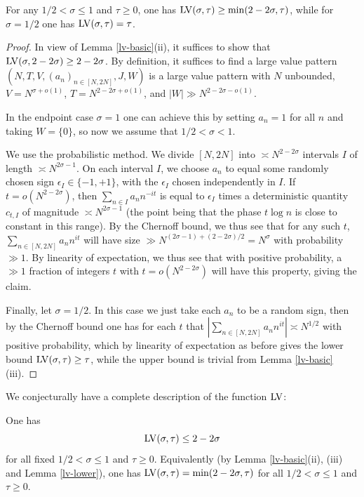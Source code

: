 \begin{lemma}\label{lv-lower}  For any $1/2 < \sigma \leq 1$ and $\tau \geq 0$, one has $\mathrm{LV}(\sigma, \tau) \geq \min(2 - 2 \sigma,\tau)$, while for $\sigma=1/2$ one has $\mathrm{LV}(\sigma,\tau) = \tau$.
\end{lemma}

\begin{proof} In view of Lemma \ref{lv-basic}(ii), it suffices to show that $\mathrm{LV}(\sigma, 2-2\sigma) \geq 2-2\sigma$.  By definition, it suffices to find a large value pattern $(N,T,V,(a_n)_{n \in [N,2N]},J,W)$ is a large value pattern with $N$ unbounded, $V=N^{\sigma+o(1)}$, $T = N^{2-2\sigma+o(1)}$, and $|W| \gg N^{2-2\sigma-o(1)}$.

In the endpoint case $\sigma = 1$ one can achieve this by setting $a_n=1$ for all $n$ and taking $W=\{0\}$, so now we assume that $1/2 < \sigma<1$.

We use the probabilistic method.  We divide $[N,2N]$ into $\asymp N^{2-2\sigma}$ intervals $I$ of length $\asymp N^{2\sigma-1}$.  On each interval $I$, we choose $a_n$ to equal some randomly chosen sign $\epsilon_I \in \{-1,+1\}$, with the $\epsilon_I$ chosen independently in $I$.  If $t = o(N^{2-2\sigma})$, then $\sum_{n \in I} a_n n^{-it}$ is equal to $\epsilon_I$ times a deterministic quantity $c_{t,I}$ of magnitude $\asymp N^{2\sigma-1}$ (the point being that the phase $t \log n$ is close to constant in this range).  By the Chernoff bound, we thus see that for any such $t$, $\sum_{n \in [N,2N]} a_n n^{it}$ will have size $\gg N^{(2\sigma-1) + (2-2\sigma)/2} = N^\sigma$ with probability $\gg 1$. By linearity of expectation, we thus see that with positive probability, a $\gg 1$ fraction of integers $t$ with $t = o(N^{2-2\sigma})$ will have this property, giving the claim.

Finally, let $\sigma=1/2$.  In this case we just take each $a_n$ to be a random sign, then by the Chernoff bound one has for each $t$ that $|\sum_{n \in [N,2N]} a_n n^{it}| \asymp N^{1/2}$ with positive probability, which by linearity of expectation as before gives the lower bound $\mathrm{LV}(\sigma,\tau) \geq \tau$, while the upper bound is trivial from Lemma \ref{lv-basic}(iii).
\end{proof}

We conjecturally have a complete description of the function $\mathrm{LV}$:

\begin{conjecture}\label{montgomery-conj}  One has
    \begin{equation}\label{mont-conj}
        \mathrm{LV}(\sigma, \tau) \leq 2 - 2 \sigma
    \end{equation}
     for all fixed $1/2 < \sigma \leq 1$ and $\tau \geq 0$. Equivalently (by Lemma \ref{lv-basic}(ii), (iii) and Lemma \ref{lv-lower}), one has $\mathrm{LV}(\sigma, \tau) = \min(2 - 2 \sigma,\tau)$ for all $1/2 < \sigma \leq 1$ and $\tau \geq 0$.
\end{conjecture}

